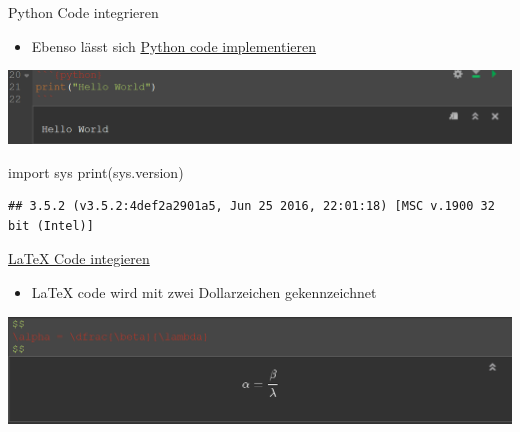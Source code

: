 \documentclass[ignorenonframetext,]{beamer}
\newenvironment{Shaded}{}{}
\newcommand{\ImportTok}[1]{{#1}}
\newcommand{\BuiltInTok}[1]{{#1}}
\newcommand{\NormalTok}[1]{{#1}}
\providecommand{\tightlist}{%
\setlength{\itemsep}{0pt}\setlength{\parskip}{0pt}}
\begin{document}
\begin{frame}[fragile]{Python Code integrieren}

\begin{itemize}
\tightlist
\item
  Ebenso lässt sich
  \href{https://support.rstudio.com/hc/en-us/articles/233066128-Do-Notebooks-support-other-languages-}{Python
  code implementieren}
\end{itemize}

\includegraphics{./tex2pdf.956/e34ce4ae055b28f5d5589f20831af0133977e345.png}

\begin{Shaded}
\begin{Highlighting}[]
\ImportTok{import} \NormalTok{sys}
\BuiltInTok{print}\NormalTok{(sys.version)}
\end{Highlighting}
\end{Shaded}

\begin{verbatim}
## 3.5.2 (v3.5.2:4def2a2901a5, Jun 25 2016, 22:01:18) [MSC v.1900 32 bit (Intel)]
\end{verbatim}

\end{frame}

\begin{frame}{\href{https://blog.rstudio.org/2016/10/05/r-notebooks/}{LaTeX
Code integieren}}

\begin{itemize}
\tightlist
\item
  LaTeX code wird mit zwei Dollarzeichen gekennzeichnet
\end{itemize}

\includegraphics{./tex2pdf.956/18003bb3eb50842bc98ffd9054f093288bfcbcf5.png}

\end{frame}
\end{document}
